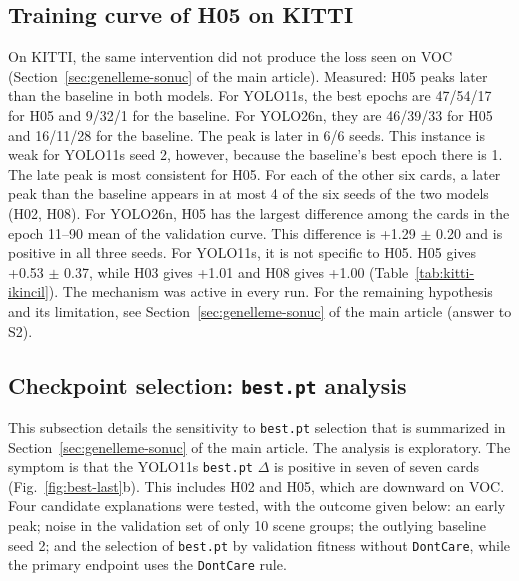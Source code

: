 \subsection{Training curve of H05 on KITTI}\label{sec:ek-h05-kitti}
On KITTI, the same intervention did not produce the loss seen on VOC (Section~\ref{sec:genelleme-sonuc} of the main article). Measured: H05 peaks later than the baseline in both models. For YOLO11s, the best epochs are 47/54/17 for H05 and 9/32/1 for the baseline. For YOLO26n, they are 46/39/33 for H05 and 16/11/28 for the baseline. The peak is later in 6/6 seeds. This instance is weak for YOLO11s seed 2, however, because the baseline's best epoch there is 1. The late peak is most consistent for H05. For each of the other six cards, a later peak than the baseline appears in at most 4 of the six seeds of the two models (H02, H08). For YOLO26n, H05 has the largest difference among the cards in the epoch 11--90 mean of the validation curve. This difference is +1.29 $\pm$ 0.20 and is positive in all three seeds. For YOLO11s, it is not specific to H05. H05 gives +0.53 $\pm$ 0.37, while H03 gives +1.01 and H08 gives +1.00 (Table~\ref{tab:kitti-ikincil}). The mechanism was active in every run. For the remaining hypothesis and its limitation, see Section~\ref{sec:genelleme-sonuc} of the main article (answer to S2).

\subsection{Checkpoint selection: \texttt{best.pt} analysis}\label{sec:ek-kontrol-noktasi}
This subsection details the sensitivity to \texttt{best.pt} selection that is summarized in Section~\ref{sec:genelleme-sonuc} of the main article. The analysis is exploratory. The symptom is that the YOLO11s \texttt{best.pt} $\Delta$ is positive in seven of seven cards (Fig.~\ref{fig:best-last}b). This includes H02 and H05, which are downward on VOC. Four candidate explanations were tested, with the outcome given below:
an early peak;
noise in the validation set of only 10 scene groups;
the outlying baseline seed 2;
and the selection of \texttt{best.pt} by validation fitness without \texttt{DontCare}, while the primary endpoint uses the \texttt{DontCare} rule.

{%
}

